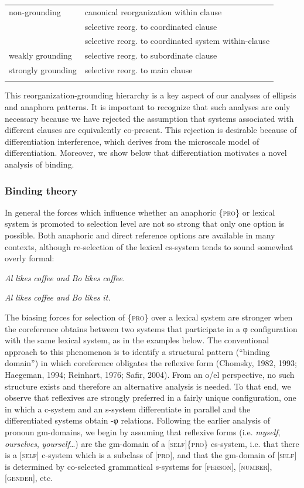 \begin{tabularx}{\textwidth}{XX}
\lsptoprule
non-grounding & canonical reorganization within clause\\
& selective reorg. to coordinated clause\\
& selective reorg. to coordinated system within-clause\\
weakly grounding & selective reorg. to subordinate clause\\
strongly grounding & selective reorg. to main clause\\
\lspbottomrule
\end{tabularx}
  This reorganization-grounding hierarchy is a key aspect of our analyses of ellipsis and anaphora patterns. It is important to recognize that such analyses are only necessary because we have rejected the assumption that systems associated with different clauses are equivalently co-present. This rejection is desirable because of differentiation interference, which derives from the microscale model of differentiation. Moreover, we show below that differentiation motivates a novel analysis of binding.

\subsubsection{Binding theory}

In general the forces which influence whether an anaphoric \{\textsc{pro}\} or lexical system is promoted to selection level are not so strong that only one option is possible. Both anaphoric and direct reference options are available in many contexts, although re-selection of the lexical cs-system tends to sound somewhat overly formal:

    \textit{Al} \textit{likes} \textit{coffee} \textit{and} \textit{Bo} \textit{likes} \textit{coffee.}

    \textit{Al} \textit{likes} \textit{coffee} \textit{and} \textit{Bo} \textit{likes} \textit{it.}

  The biasing forces for selection of \{\textsc{pro}\} over a lexical system are stronger when the coreference obtains between two systems that participate in a φ configuration with the same lexical system, as in the examples below. The conventional approach to this phenomenon is to identify a structural pattern (“binding domain”) in which coreference obligates the reflexive form (Chomsky, 1982, 1993; Haegeman, 1994; Reinhart, 1976; Safir, 2004). From an o/el perspective, no such structure exists and therefore an alternative analysis is needed. To that end, we observe that reflexives are strongly preferred in a fairly unique configuration, one in which a c-system and an s-system differentiate in parallel and the differentiated systems obtain -φ relations. Following the earlier analysis of pronoun gm-domains, we begin by assuming that reflexive forms (i.e. \textit{myself}, \textit{ourselves}, \textit{yourself}…) are the gm-domain of a [\textsc{self}]\{\textsc{pro}\} cs-system, i.e. that there is a [\textsc{self}] c-system which is a subclass of [\textsc{pro}], and that the gm-domain of [\textsc{self}] is determined by co-selected grammatical s-systems for [\textsc{person}], [\textsc{number}], [\textsc{gender}], etc. 

